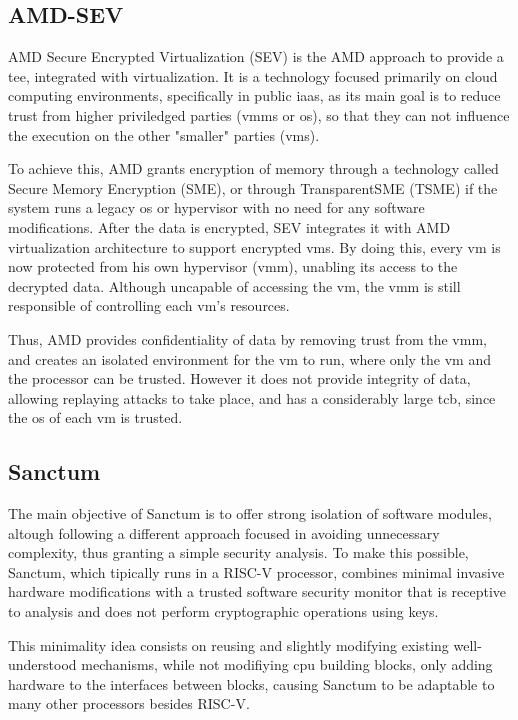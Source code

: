 \subsection{AMD-SEV}
\label{ssec:amdsev}
AMD Secure Encrypted Virtualization (SEV) is the AMD approach to provide a \gls{tee}, integrated with virtualization. It is a technology focused primarily on cloud computing environments, specifically in public \gls{iaas}, as its main goal is to reduce trust from higher priviledged parties (\gls{vmm}s or \gls{os}), so that they can not influence the execution on the other "smaller" parties (\gls{vm}s). 

To achieve this, AMD grants encryption of memory through a technology called Secure Memory Encryption (SME), or through TransparentSME (TSME) if the system runs a legacy \gls{os} or hypervisor with no need for any software modifications.
After the data is encrypted, SEV integrates it with AMD virtualization architecture to support encrypted \gls{vm}s. By doing this, every \gls{vm} is now protected from his own hypervisor (\gls{vmm}), unabling its access to the decrypted data. Although uncapable of accessing the \gls{vm}, the \gls{vmm} is still responsible of controlling each \gls{vm}'s resources. \cite{amdPaper}

Thus, AMD provides confidentiality of data by removing trust from the \gls{vmm}, and creates an isolated environment for the \gls{vm} to run, where only the \gls{vm} and the processor can be trusted. However it does not provide integrity of data, allowing replaying attacks to take place, and has a considerably large \gls{tcb}, since the \gls{os} of each \gls{vm} is trusted. \cite{amdSEVPaper}

\subsection{Sanctum}
\label{ssec:sanctum}
The main objective of Sanctum \cite{sanctumPaper} is to offer strong isolation of software modules, altough following a different approach focused in avoiding unnecessary complexity, thus granting a simple security analysis.
To make this possible, Sanctum, which tipically runs in a RISC-V processor, combines minimal invasive hardware modifications with a trusted software security monitor that is receptive to analysis and does not perform cryptographic operations using keys. 

This minimality idea consists on reusing and slightly modifying existing well-understood mechanisms, while not modifiying \gls{cpu} building blocks, only adding hardware to the interfaces between blocks, causing Sanctum to be adaptable to many other processors besides RISC-V. 

